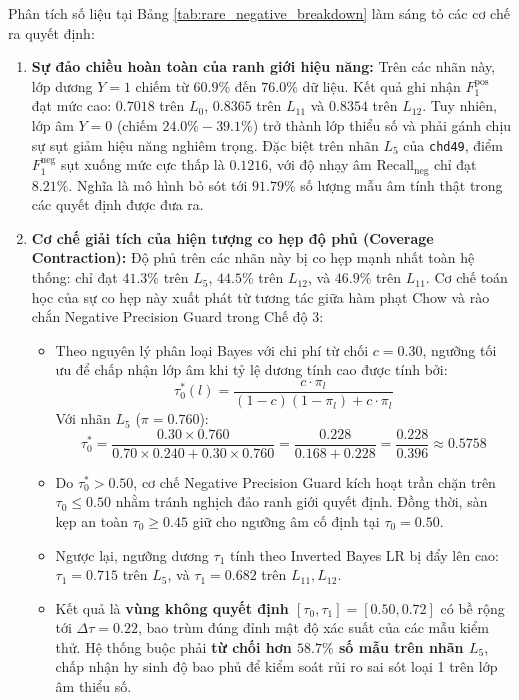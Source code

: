 \documentclass[10pt,a4paper]{article}
\begin{document}
Phân tích số liệu tại Bảng \ref{tab:rare_negative_breakdown} làm sáng tỏ các cơ chế ra quyết định:
\begin{enumerate}[leftmargin=*]
    \item \textbf{Sự đảo chiều hoàn toàn của ranh giới hiệu năng:} 
    Trên các nhãn này, lớp dương $Y=1$ chiếm từ $60.9\%$ đến $76.0\%$ dữ liệu. Kết quả ghi nhận $F_1^{\text{pos}}$ đạt mức cao: $0.7018$ trên $L_0$, $0.8365$ trên $L_{11}$ và $0.8354$ trên $L_{12}$. 
    Tuy nhiên, lớp âm $Y=0$ (chiếm $24.0\% - 39.1\%$) trở thành lớp thiểu số và phải gánh chịu sự sụt giảm hiệu năng nghiêm trọng. Đặc biệt trên nhãn $L_5$ của \texttt{chd49}, điểm $F_1^{\text{neg}}$ sụt xuống mức cực thấp là \textbf{$0.1216$}, với độ nhạy âm $\text{Recall}_{\text{neg}}$ chỉ đạt \textbf{$8.21\%$}. Nghĩa là mô hình bỏ sót tới $91.79\%$ số lượng mẫu âm tính thật trong các quyết định được đưa ra.
    
    \item \textbf{Cơ chế giải tích của hiện tượng co hẹp độ phủ (Coverage Contraction):} 
    Độ phủ trên các nhãn này bị co hẹp mạnh nhất toàn hệ thống: chỉ đạt $41.3\%$ trên $L_5$, $44.5\%$ trên $L_{12}$, và $46.9\%$ trên $L_{11}$. Cơ chế toán học của sự co hẹp này xuất phát từ tương tác giữa hàm phạt Chow và rào chắn Negative Precision Guard trong Chế độ 3:
    \begin{itemize}[leftmargin=*]
        \item Theo nguyên lý phân loại Bayes với chi phí từ chối $c=0.30$, ngưỡng tối ưu để chấp nhận lớp âm khi tỷ lệ dương tính cao được tính bởi:
        \begin{equation}
            \tau_0^*(l) = \frac{c \cdot \pi_l}{(1 - c)(1 - \pi_l) + c \cdot \pi_l}
        \end{equation}
        Với nhãn $L_5$ ($\pi = 0.760$):
        \begin{equation}
            \tau_0^* = \frac{0.30 \times 0.760}{0.70 \times 0.240 + 0.30 \times 0.760} = \frac{0.228}{0.168 + 0.228} = \frac{0.228}{0.396} \approx 0.5758
        \end{equation}
        \item Do $\tau_0^* > 0.50$, cơ chế Negative Precision Guard kích hoạt trần chặn trên $\tau_0 \le 0.50$ nhằm tránh nghịch đảo ranh giới quyết định. Đồng thời, sàn kẹp an toàn $\tau_0 \ge 0.45$ giữ cho ngưỡng âm cố định tại $\tau_0 = 0.50$.
        \item Ngược lại, ngưỡng dương $\tau_1$ tính theo Inverted Bayes LR bị đẩy lên cao: $\tau_1 = 0.715$ trên $L_5$, và $\tau_1 = 0.682$ trên $L_{11}, L_{12}$.
        \item Kết quả là \textbf{vùng không quyết định $[\tau_0, \tau_1] = [0.50, 0.72]$} có bề rộng tới $\Delta \tau = 0.22$, bao trùm đúng đỉnh mật độ xác suất của các mẫu kiểm thử. Hệ thống buộc phải \textbf{từ chối hơn $58.7\%$ số mẫu trên nhãn $L_5$}, chấp nhận hy sinh độ bao phủ để kiểm soát rủi ro sai sót loại 1 trên lớp âm thiểu số.
    \end{itemize}
\end{enumerate}
\end{document}

